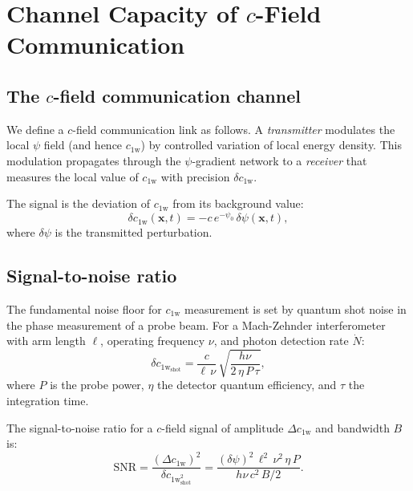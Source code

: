 \documentclass[aps,prd,twocolumn,superscriptaddress,nofootinbib,floatfix]{revtex4-2}
\newcommand{\psifield}{\psi}
\newcommand{\cfield}{c_{\text{1w}}}
\newcommand{\cvac}{c}
\newcommand{\xvec}{\mathbf{x}}
\newcommand{\snr}{\text{SNR}}
\begin{document}
\section{Channel Capacity of $c$-Field Communication}
\label{sec:channel}

\subsection{The $c$-field communication channel}

We define a $c$-field communication link as follows. A
\emph{transmitter} modulates the local $\psifield$ field (and
hence $\cfield$) by controlled variation of local energy density.
This modulation propagates through the $\psifield$-gradient
network to a \emph{receiver} that measures the local value of
$\cfield$ with precision $\delta\cfield$.

The signal is the deviation of $\cfield$ from its background value:
\begin{equation}
\delta\cfield(\xvec,t) = -\cvac\,e^{-\psifield_0}\,
\delta\psifield(\xvec,t),
\label{eq:signal_definition}
\end{equation}
where $\delta\psifield$ is the transmitted perturbation.

\subsection{Signal-to-noise ratio}

The fundamental noise floor for $\cfield$ measurement is set by
quantum shot noise in the phase measurement of a probe beam.
For a Mach-Zehnder interferometer with arm length $\ell$,
operating frequency $\nu$, and photon detection rate $\dot{N}$:
\begin{equation}
\delta\cfield_{\text{shot}} = \frac{\cvac}{\ell\,\nu}\,
\sqrt{\frac{h\nu}{2\,\eta\,P\,\tau}},
\label{eq:shot_noise}
\end{equation}
where $P$ is the probe power, $\eta$ the detector quantum
efficiency, and $\tau$ the integration time.

The signal-to-noise ratio for a $c$-field signal of amplitude
$\Delta\cfield$ and bandwidth $B$ is:
\begin{equation}
\snr = \frac{(\Delta\cfield)^2}{\delta\cfield_{\text{shot}}^2}
= \frac{(\delta\psifield)^2\,\ell^2\,\nu^2\,
\eta\,P}{h\nu\,\cvac^2\,B/2}.
\label{eq:snr}
\end{equation}
\end{document}
